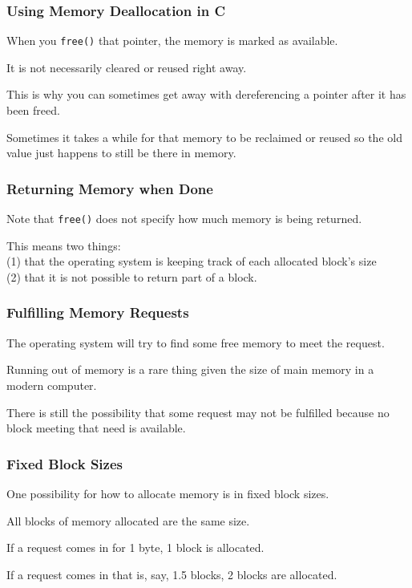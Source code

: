 \begin{frame}
\frametitle{Using Memory Deallocation in C}

When you \texttt{free()} that pointer, the memory is marked as available.

It is not necessarily cleared or reused right away.

This is why you can sometimes get away with dereferencing a pointer after it has been freed. 

Sometimes it takes a while for that memory to be reclaimed or reused so the old value just happens to still be there in memory. 

\end{frame}

\begin{frame}
\frametitle{Returning Memory when Done}

Note that \texttt{free()} does not specify how much memory is being returned. 

This means two things:\\ 
\quad (1) that the operating system is keeping track of each allocated block's size\\
\quad (2) that it is not possible to return part of a block.



\end{frame}

\begin{frame}
\frametitle{Fulfilling Memory Requests}

The operating system will try to find some free memory to meet the request. 

Running out of memory is a rare thing given the size of main memory in a modern computer.

There is still the possibility that some request may not be fulfilled because no block meeting that need is available.

\end{frame}

\begin{frame}
\frametitle{Fixed Block Sizes}

One possibility for how to allocate memory is in fixed block sizes. 

All blocks of memory allocated are the same size. 

If a request comes in for 1 byte, 1 block is allocated. 

If a request comes in that is, say, 1.5 blocks, 2 blocks are allocated. 


\end{frame}

